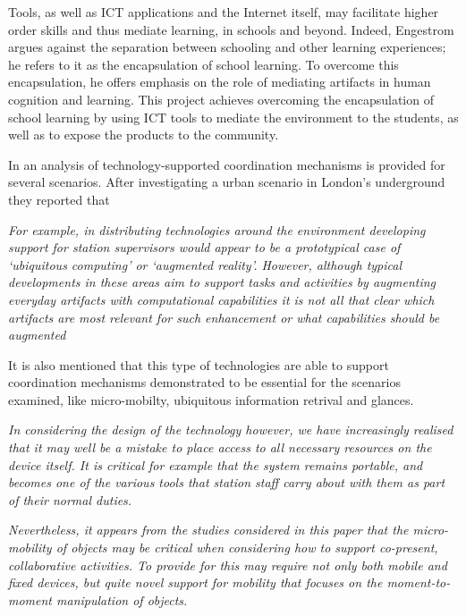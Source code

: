 Tools, as well as ICT applications and the Internet itself, may facilitate higher order skills and thus mediate learning, in schools and beyond\cite{kashdan_outdoors_2013}. Indeed, Engestrom\cite{engestrom_non_1991} argues against the separation between schooling and other learning experiences; he refers to it as the encapsulation of school learning. To overcome this encapsulation, he offers emphasis on the role of mediating artifacts in human cognition and learning.
This project achieves overcoming the encapsulation of school learning by using ICT tools to mediate the environment to the students, as well as to expose the products to the community\cite{kashdan_outdoors_2013}.

In \cite{luff_mobility_1998} an analysis of technology-supported coordination mechanisms is provided for several scenarios.
After investigating a urban scenario in London's underground they reported that 

\textit{For example, in distributing technologies around the environment developing support for station supervisors would appear to be a prototypical case of ‘ubiquitous computing’ or
‘augmented reality’. However, although typical developments in these areas aim to support tasks and activities by augmenting everyday artifacts with computational capabilities it is not all that clear which artifacts are most relevant for such enhancement or what capabilities should be augmented}

It is also mentioned that this type of technologies are able to support coordination mechanisms demonstrated to be essential for the scenarios examined, like micro-mobilty, ubiquitous information retrival and glances.

\textit{
In considering the design of the technology however, we have increasingly realised that it may well be a mistake to place access to all necessary resources on the device itself. It is critical for example that the system remains portable, and becomes one of the various tools that station staff carry about with them as part of their normal duties.}

\textit{Nevertheless, it appears from the studies considered in this paper that the micro-mobility of objects may be critical when considering how to support co-present, collaborative activities. To provide for this may require not only both mobile and fixed devices, but quite novel support for mobility that focuses on the moment-to-moment manipulation of objects.}


